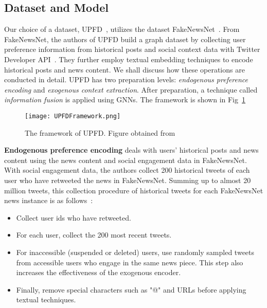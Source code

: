 \subsection{Dataset and Model}
\label{subsec:mixedApproaches_DatasetAndModel}
Our choice of a dataset, UPFD~\parencite{UPFD_Dataset_Shu}, utilizes the dataset FakeNewsNet~\parencite{FakeNewsNet_Shu}. From FakeNewsNet, the authors of UPFD build a graph dataset by collecting user preference information from historical posts and social context data with Twitter Developer API~\parencite{TwitterAPI_Twitter}. They further employ textual embedding techniques to encode historical posts and news content. We shall discuss how these operations are conducted in detail. UPFD has two preparation levels: \emph{endogenous preference encoding} and \emph{exogenous context extraction}. After preparation, a technique called \emph{information fusion} is applied using GNNs. The framework is shown in Fig~\ref{fig:UPFD_Framework}\\
\begin{figure}
    \centering
    \texttt{[image: UPFDFramework.png]}
    \caption[UPFD Framework]{The framework of UPFD. Figure obtained from~\parencite{UPFD_Dataset_Shu}}
    \label{fig:UPFD_Framework}
\end{figure}
\textbf{Endogenous preference encoding} deals with users' historical posts and news content using the news content and social engagement data in FakeNewsNet. With social engagement data, the authors collect 200 historical tweets of each user who have retweeted the news in FakeNewsNet. Summing up to almost 20 million tweets, this collection procedure of historical tweets for each FakeNewsNet news instance is as follows~\parencite{UPFD_Dataset_Shu}:
\begin{itemize}
    \item Collect user ids who have retweeted.
    \item For each user, collect the 200 most recent tweets.
    \item For inaccessible (suspended or deleted) users, use randomly sampled tweets from accessible users who engage in the same news piece. This step also increases the effectiveness of the exogenous encoder.
    \item  Finally, remove special characters such as "@" and URLs before applying textual techniques.
\end{itemize}
